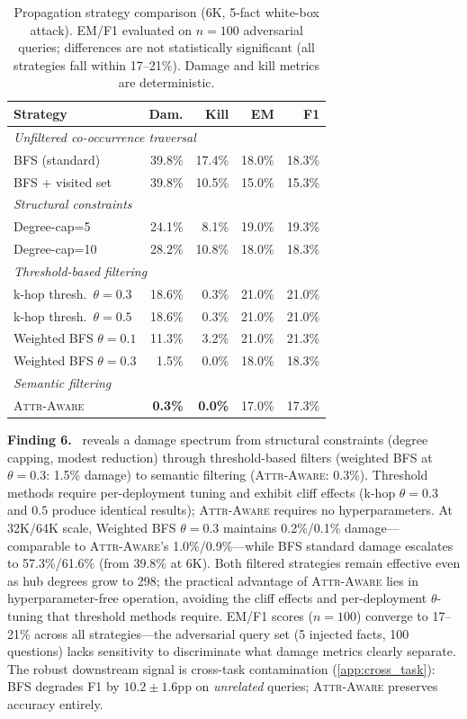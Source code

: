 \documentclass{article}
\newcommand{\attraware}{\textsc{Attr-Aware}}
\newcommand{\finding}[1]{\vspace{2pt}\noindent\textbf{Finding #1.}~}
\begin{document}
\begin{table}[htbp]
\centering
\footnotesize
\begin{tabular}{lrrrr}
\toprule
\textbf{Strategy} & \textbf{Dam.} & \textbf{Kill} & \textbf{EM} & \textbf{F1} \\
\midrule
\multicolumn{5}{l}{\textit{Unfiltered co-occurrence traversal}} \\
BFS (standard) & 39.8\% & 17.4\% & 18.0\% & 18.3\% \\
BFS + visited set & 39.8\% & 10.5\% & 15.0\% & 15.3\% \\
\midrule
\multicolumn{5}{l}{\textit{Structural constraints}} \\
Degree-cap=5 & 24.1\% & 8.1\% & 19.0\% & 19.3\% \\
Degree-cap=10 & 28.2\% & 10.8\% & 18.0\% & 18.3\% \\
\midrule
\multicolumn{5}{l}{\textit{Threshold-based filtering}} \\
k-hop thresh.\ $\theta{=}0.3$ & 18.6\% & 0.3\% & 21.0\% & 21.0\% \\
k-hop thresh.\ $\theta{=}0.5$ & 18.6\% & 0.3\% & 21.0\% & 21.0\% \\
Weighted BFS $\theta{=}0.1$ & 11.3\% & 3.2\% & 21.0\% & 21.3\% \\
Weighted BFS $\theta{=}0.3$ & 1.5\% & 0.0\% & 18.0\% & 18.3\% \\
\midrule
\multicolumn{5}{l}{\textit{Semantic filtering}} \\
\attraware{} & \textbf{0.3\%} & \textbf{0.0\%} & 17.0\% & 17.3\% \\
\bottomrule
\end{tabular}
\caption{Propagation strategy comparison (6K, 5-fact white-box attack). EM/F1 evaluated on $n{=}100$ adversarial queries; differences are not statistically significant (all strategies fall within 17--21\%). Damage and kill metrics are deterministic.}
\label{tab:defense}
\end{table}

\finding{6}  reveals a damage spectrum from structural constraints (degree capping, modest reduction) through threshold-based filters (weighted BFS at $\theta{=}0.3$: 1.5\% damage) to semantic filtering (\attraware{}: 0.3\%).
Threshold methods require per-deployment tuning and exhibit cliff effects (k-hop $\theta{=}0.3$ and $0.5$ produce identical results); \attraware{} requires no hyperparameters.
At 32K/64K scale, Weighted BFS $\theta{=}0.3$ maintains 0.2\%/0.1\% damage---comparable to \attraware{}'s 1.0\%/0.9\%---while BFS standard damage escalates to 57.3\%/61.6\% (from 39.8\% at 6K).
Both filtered strategies remain effective even as hub degrees grow to 298; the practical advantage of \attraware{} lies in hyperparameter-free operation, avoiding the cliff effects and per-deployment $\theta$-tuning that threshold methods require.
EM/F1 scores ($n{=}100$) converge to 17--21\% across all strategies---the adversarial query set (5 injected facts, 100 questions) lacks sensitivity to discriminate what damage metrics clearly separate.
The robust downstream signal is cross-task contamination (\cref{app:cross_task}): BFS degrades F1 by $10.2\pm1.6$pp on \textit{unrelated} queries; \attraware{} preserves accuracy entirely.
\end{document}
